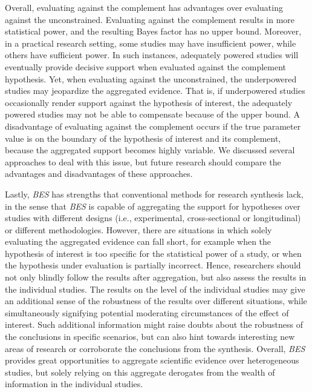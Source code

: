 \documentclass[
  authoryear,
  preprint,
  5p,
  twocolumn]{elsarticle}
\begin{document}
Overall, evaluating against the complement has advantages over
evaluating against the unconstrained. Evaluating against the complement
results in more statistical power, and the resulting Bayes factor has no
upper bound. Moreover, in a practical research setting, some studies may
have insufficient power, while others have sufficient power. In such
instances, adequately powered studies will eventually provide decisive
support when evaluated against the complement hypothesis. Yet, when
evaluating against the unconstrained, the underpowered studies may
jeopardize the aggregated evidence. That is, if underpowered studies
occasionally render support against the hypothesis of interest, the
adequately powered studies may not be able to compensate because of the
upper bound. A disadvantage of evaluating against the complement occurs
if the true parameter value is on the boundary of the hypothesis of
interest and its complement, because the aggregated support becomes
highly variable. We discussed several approaches to deal with this
issue, but future research should compare the advantages and
disadvantages of these approaches.

Lastly, \emph{BES} has strengths that conventional methods for research
synthesis lack, in the sense that \emph{BES} is capable of aggregating
the support for hypotheses over studies with different designs (i.e.,
experimental, cross-sectional or longitudinal) or different
methodologies. However, there are situations in which solely evaluating
the aggregated evidence can fall short, for example when the hypothesis
of interest is too specific for the statistical power of a study, or
when the hypothesis under evaluation is partially incorrect. Hence,
researchers should not only blindly follow the results after
aggregation, but also assess the results in the individual studies. The
results on the level of the individual studies may give an additional
sense of the robustness of the results over different situations, while
simultaneously signifying potential moderating circumstances of the
effect of interest. Such additional information might raise doubts about
the robustness of the conclusions in specific scenarios, but can also
hint towards interesting new areas of research or corroborate the
conclusions from the synthesis. Overall, \emph{BES} provides great
opportunities to aggregate scientific evidence over heterogeneous
studies, but solely relying on this aggregate derogates from the wealth
of information in the individual studies.


\renewcommand\refname{References}
  
\end{document}
